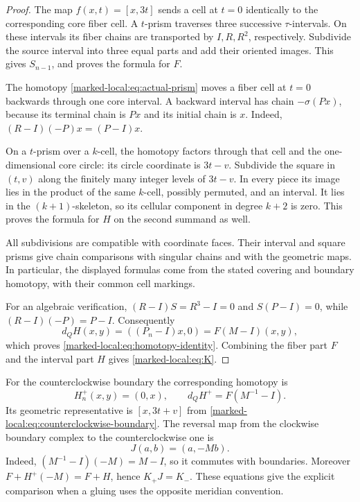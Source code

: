 \begin{proof}
The map $f(x,t)=[x,3t]$ sends a cell at $t=0$ identically to the
corresponding core fiber cell. A $t$-prism traverses three successive
$\tau$-intervals. On these intervals its fiber chains are transported
by $I,R,R^2$, respectively. Subdivide the source interval into three
equal parts and add their oriented images. This gives $S_{n-1}$,
and proves the formula for $F$.

The homotopy \eqref{marked-local:eq:actual-prism} moves a fiber cell at $t=0$
backwards through one core interval. A backward interval has chain
$-\sigma(Px)$, because its terminal chain is $Px$ and its initial
chain is $x$. Indeed,
$(R-I)(-P)x=(P-I)x$.

On a $t$-prism over a $k$-cell, the
homotopy factors through that cell and the one-dimensional core circle:
its circle coordinate is $3t-v$. Subdivide the square in $(t,v)$
along the finitely many integer levels of $3t-v$. In every piece its
image lies in the product of the same $k$-cell, possibly permuted,
and an interval. It lies in the $(k+1)$-skeleton, so its cellular
component in degree $k+2$ is zero. This proves the formula for $H$
on the second summand as well.

All subdivisions are compatible with coordinate faces. Their interval
and square prisms give chain comparisons with singular chains and
with the geometric maps. In particular, the displayed formulas come
from the stated covering and boundary homotopy, with their common
cell markings.

For an algebraic verification, $(R-I)S=R^3-I=0$ and
$S(P-I)=0$, while $(R-I)(-P)=P-I$. Consequently
\[
 d_QH(x,y)=((P_n-I)x,0)=F(M-I)(x,y),
\]
which proves \eqref{marked-local:eq:homotopy-identity}. Combining the fiber part
$F$ and the interval part $H$ gives \eqref{marked-local:eq:K}.
\end{proof}

For the counterclockwise boundary the corresponding homotopy is
\begin{equation}\label{marked-local:eq:positive-H}
 H_n^+(x,y)=(0,x),\qquad d_QH^+=F(M^{-1}-I).
\end{equation}
Its geometric representative is $[x,3t+v]$ from
\eqref{marked-local:eq:counterclockwise-boundary}.
The reversal map from the clockwise boundary complex to the
counterclockwise one is
\[
 J(a,b)=(a,-Mb).
\]
Indeed, $(M^{-1}-I)(-M)=M-I$, so it commutes with boundaries.
Moreover $F+H^+(-M)=F+H$, hence $K_+J=K_-$.
These equations give the explicit comparison when a gluing uses the
opposite meridian convention.

